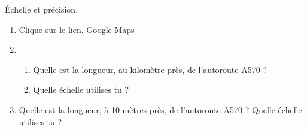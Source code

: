 
Échelle et précision.
\begin{enumerate}
\item Clique sur le lien. \href{https://www.google.com/maps/place/Cart\%C3\%A9,+65270,+France/@43.1022476,6.0703528,12.83z/data=!4m5!3m4!1s0xd57cdc9541a448b:0x8f62403cc90fc436!8m2!3d43.11184!4d-0.182035}{Google Maps}
\item
\begin{enumerate}
\item Quelle est la longueur, au kilomètre près, de l'autoroute A570 ?
\item Quelle échelle utilises tu ?
\end{enumerate}
\item
 Quelle est la longueur, à 10 mètres près, de l'autoroute A570 ? Quelle échelle utilises tu ?
\end{enumerate}